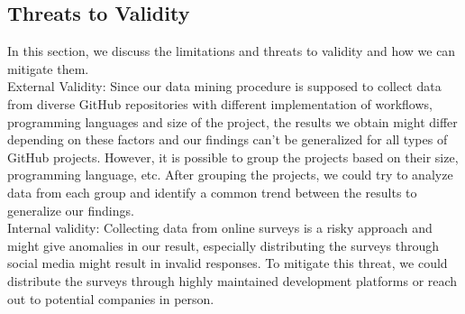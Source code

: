 \documentclass[conference]{IEEEtran}
\begin{document}
\subsection{Threats to Validity}
In this section, we discuss the limitations and threats to
validity and how we can mitigate them.\\

External Validity: Since our data mining procedure is supposed to collect data from diverse GitHub repositories with different implementation of workflows, programming languages and size of the project, the results we obtain might differ depending on these factors and our findings can’t be generalized for all types of GitHub projects. However, it is possible to group the projects based on their size, programming language, etc. After grouping the projects, we could try to analyze data from each group and identify a common trend between the results to generalize our findings.\\

Internal validity: Collecting data from online surveys is a risky approach and might give anomalies in our result, especially distributing the surveys through social media might result in invalid responses. To mitigate this threat, we could distribute the surveys through highly maintained development platforms or reach out to potential companies in person. 
\end{document}
